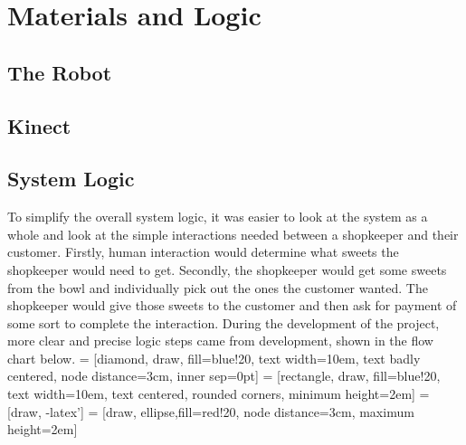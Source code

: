 \chapter{Materials and Logic}
\label{chapter3}
\section{The Robot}
\section{Kinect}
\section{System Logic}
To simplify the overall system logic, it was easier to look at the system as a whole and look at the simple interactions needed between a shopkeeper and their customer. Firstly, human interaction would determine what sweets the shopkeeper would need to get. Secondly, the shopkeeper would get some sweets from the bowl and individually pick out the ones the customer wanted. The shopkeeper would give those sweets to the customer and then ask for payment of some sort to complete the interaction. During the development of the project, more clear and precise logic steps came from development, shown in the flow chart below.
\newline
 = [diamond, draw, fill=blue!20, 
    text width=10em, text badly centered, node distance=3cm, inner sep=0pt]
 = [rectangle, draw, fill=blue!20, 
    text width=10em, text centered, rounded corners, minimum height=2em]
 = [draw, -latex']
 = [draw, ellipse,fill=red!20, node distance=3cm,
    maximum height=2em]
    
